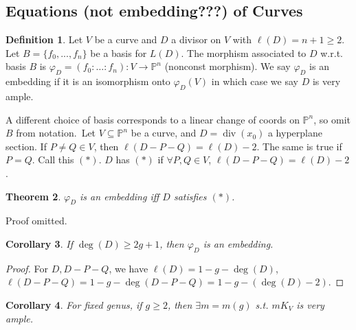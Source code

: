 \documentclass{article}
\theoremstyle{definition}
\newtheorem{defn}{Definition}[section]
\theoremstyle{remark}
\theoremstyle{plain}
\newtheorem{thm}[defn]{Theorem}
\newtheorem{crly}[defn]{Corollary}
\newcommand{\PP}{\mathbb{P}}
\newcommand{\divi}{\operatorname{div}}
\begin{document}
\subsection{Equations (not embedding???) of Curves}
\begin{defn}
    Let $V$ be a curve and $D$ a divisor on $V$ with $\ell(D)=n+1\ge 2$. Let $B=\{f_0,...,f_n\}$ be a basis for $L(D)$. The morphism associated to $D$ w.r.t. basis $B$ is $\varphi_D=(f_0:\ldots:f_n):V\to\PP^n$ (nonconst morphism). We say $\varphi_D$ is an embedding if it is an isomorphism onto $\varphi_D(V)$ in which case we say $D$ is very ample.
\end{defn}
A different choice of basis corresponds to a linear change of coords on $\PP^n$, so omit $B$ from notation.\
Let $V\subseteq\PP^n$ be a curve, and $D=\divi(x_0)$ a hyperplane section. If $P\neq Q\in V$, then $\ell(D-P-Q)=\ell(D)-2$. The same is true if $P=Q$. Call this $(\ast)$. $D$ has $(\ast)$ if $\forall P,Q\in V$, $\ell(D-P-Q)=\ell(D)-2$.
\begin{thm}
    $\varphi_D$ is an embedding iff $D$ satisfies $(\ast)$.
\end{thm}
Proof omitted.
\begin{crly}
    If $\deg (D)\ge 2g+1$, then $\varphi_D$ is an embedding.
\end{crly}
\begin{proof}
    For $D, D-P-Q$, we have $\ell(D)=1-g-\deg(D)$, $\ell(D-P-Q)=1-g-\deg(D-P-Q)=1-g-(\deg(D)-2)$.
\end{proof}
\begin{crly}
    For fixed genus, if $g\ge 2$, then $\exists m=m(g)$ s.t. $mK_V$ is very ample.
\end{crly}
\end{document}
